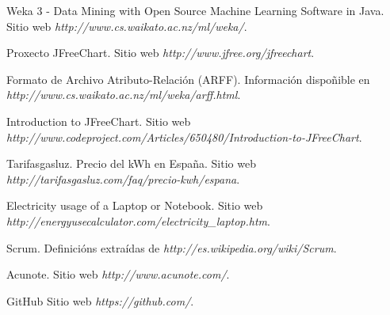 

\begin{thebibliography}{99}

 Weka 3 - Data Mining with Open Source Machine Learning Software in Java. Sitio web {\it http://www.cs.waikato.ac.nz/ml/weka/}.

 Proxecto JFreeChart. Sitio web {\it http://www.jfree.org/jfreechart}.

 Formato de Archivo Atributo-Relación (ARFF). Información dispoñible en {\it http://www.cs.waikato.ac.nz/ml/weka/arff.html}.

 Introduction to JFreeChart. Sitio web {\it http://www.codeproject.com/Articles/650480/Introduction-to-JFreeChart}.

 Tarifasgasluz. Precio del kWh en España. Sitio web {\it http://tarifasgasluz.com/faq/precio-kwh/espana}.

 Electricity usage of a Laptop or Notebook. Sitio web {\it http://energyusecalculator.com/electricity\_laptop.htm}.

 Scrum. Definicións extraídas de {\it http://es.wikipedia.org/wiki/Scrum}.

 Acunote. Sitio web {\it http://www.acunote.com/}.

 GitHub Sitio web {\it https://github.com/}.

\end{thebibliography}

